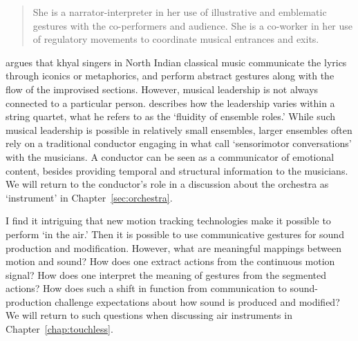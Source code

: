 \begin{quote}
She is a narrator-interpreter in her use of illustrative and emblematic gestures with the co-performers and audience. She is a co-worker in her use of regulatory movements to coordinate musical entrances and exits.
\end{quote}

\citet{leante_gesture_2014} argues that khyal singers in North Indian classical music communicate the lyrics through iconics or metaphorics, and perform abstract gestures along with the flow of the improvised sections. However, musical leadership is not always connected to a particular person. \citet{mccaleb_embodied_2014} describes how the leadership varies within a string quartet, what he refers to as the `fluidity of ensemble roles.' While such musical leadership is possible in relatively small ensembles, larger ensembles often rely on a traditional conductor engaging in what \citet{volpe_measuring_2016} call ‘sensorimotor conversations’ with the musicians. A conductor can be seen as a communicator of emotional content, besides providing temporal and structural information to the musicians. We will return to the conductor's role in a discussion about the orchestra as `instrument' in Chapter~\ref{sec:orchestra}.

I find it intriguing that new motion tracking technologies make it possible to perform `in the air.' Then it is possible to use communicative gestures for sound production and modification. However, what are meaningful mappings between motion and sound? How does one extract actions from the continuous motion signal? How does one interpret the meaning of gestures from the segmented actions? How does such a shift in function from communication to sound-production challenge expectations about how sound is produced and modified? We will return to such questions when discussing air instruments in Chapter~\ref{chap:touchless}.
